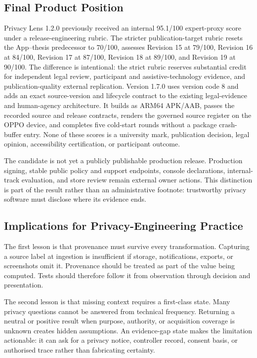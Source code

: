 \subsection{Final Product Position}

Privacy Lens 1.2.0 previously received an internal 95.1/100 expert-proxy score under a release-engineering rubric. The stricter publication-target rubric resets the App--thesis predecessor to 70/100, assesses Revision 15 at 79/100, Revision 16 at 84/100, Revision 17 at 87/100, Revision 18 at 89/100, and Revision 19 at 90/100. The difference is intentional: the strict rubric reserves substantial credit for independent legal review, participant and assistive-technology evidence, and publication-quality external replication. Version 1.7.0 uses version code 8 and adds an exact source-version and lifecycle contract to the existing legal-evidence and human-agency architecture. It builds as ARM64 APK/AAB, passes the recorded source and release contracts, renders the governed source register on the OPPO device, and completes five cold-start rounds without a package crash-buffer entry. None of these scores is a university mark, publication decision, legal opinion, accessibility certification, or participant outcome.

The candidate is not yet a publicly publishable production release. Production signing, stable public policy and support endpoints, console declarations, internal-track evaluation, and store review remain external owner actions. This distinction is part of the result rather than an administrative footnote: trustworthy privacy software must disclose where its evidence ends.

\subsection{Implications for Privacy-Engineering Practice}

The first lesson is that provenance must survive every transformation. Capturing a source label at ingestion is insufficient if storage, notifications, exports, or screenshots omit it. Provenance should be treated as part of the value being computed. Tests should therefore follow it from observation through decision and presentation.

The second lesson is that missing context requires a first-class state. Many privacy questions cannot be answered from technical frequency. Returning a neutral or positive result when purpose, authority, or acquisition coverage is unknown creates hidden assumptions. An evidence-gap state makes the limitation actionable: it can ask for a privacy notice, controller record, consent basis, or authorised trace rather than fabricating certainty.

